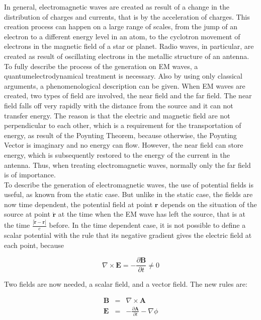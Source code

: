 \documentclass[a4paper,14pt]{extbook}
\begin{document}
In general, electromagnetic waves are created as result of a change in the distribution of charges and currents, that is by the acceleration of charges. This creation process can happen on a large range of scales, from the jump of an electron to a different energy level in an atom, to the cyclotron movement of electrons in the magnetic field of a star or planet. Radio waves, in particular, are created as result of oscillating electrons in the metallic structure of an antenna. To fully describe the process of the generation on EM waves, a quantumelectrodynamical treatment is necessary. Also by using only classical arguments, a phenomenological description can be given. When EM waves are created, two types of field are involved, the near field and the far field. The near field falls off very rapidly with the distance from the source and it can not transfer energy. The reason is that the electric and magnetic field are not perpendicular to each other, which is a requirement for the transportation of energy, as result of the Poynting Theorem, because otherwise, the Poynting Vector is imaginary and no energy can flow. However, the near field can store energy, which is subsequently restored to the energy of the current in the antenna. Thus, when treating electromagnetic waves, normally only the far field is of importance.\\

To describe the generation of electromagnetic waves, the use of potential fields is useful, as known from the static case. But unlike in the static case, the fields are now time dependent, the potential field at point $\mathbf{r}$ depends on the situation of the source at point $\mathbf{\acute{r}}$ at the time when the EM wave has left the source, that is at the time $\frac{|\mathbf{\acute{r}}-\mathbf{r}|}{c}$ before. In the time dependent case, it is not possible to define a scalar potential with the rule that its negative gradient gives the electric field at each point, because

\begin{equation}
\nabla \times \mathbf{E}=-\frac{\partial \mathbf{B}}{\partial t}\neq 0
\end{equation}

 Two fields are now needed, a scalar field, and a vector field. The new rules are:

\begin{eqnarray}
\mathbf{B}&=&\nabla \times \mathbf{A} \label{rule_B}\\
\mathbf{E}&=&-\frac{\partial \mathbf{A}}{\partial t}-\nabla \phi \label{rule_E}
\end{eqnarray}
\end{document}
